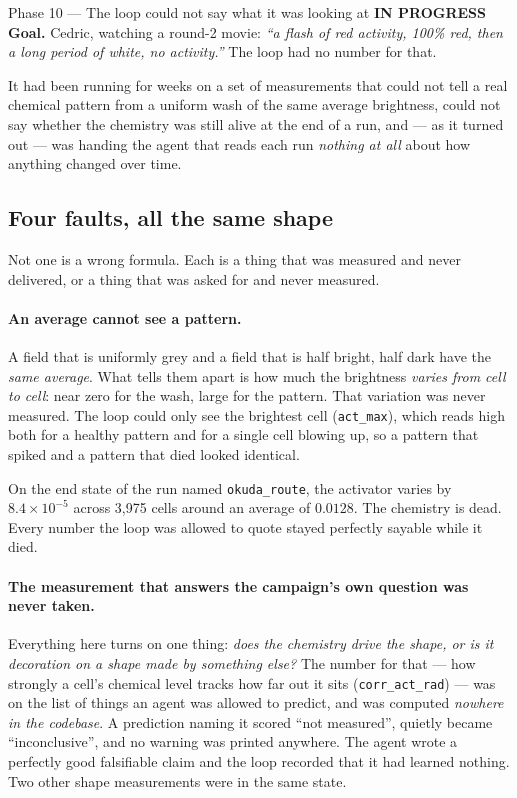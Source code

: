 \documentclass[11pt,a4paper]{article}
\newcommand{\code}[1]{\texttt{#1}}
\newcommand{\prog}{\textcolor{warn}{\textbf{IN PROGRESS}}}
\begin{document}
\begin{phasebox}{Phase 10 --- The loop could not say what it was looking at \hfill \prog}
\textbf{Goal.} Cedric, watching a round-2 movie: \emph{``a flash of red activity, 100\% red, then
a long period of white, no activity.''} The loop had no number for that.

It had been running for weeks on a set of measurements that could not tell a real chemical pattern
from a uniform wash of the same average brightness, could not say whether the chemistry was still
alive at the end of a run, and --- as it turned out --- was handing the agent that reads each run
\emph{nothing at all} about how anything changed over time.

\subsection*{Four faults, all the same shape}
Not one is a wrong formula. Each is a thing that was measured and never delivered, or a thing that
was asked for and never measured.

\paragraph{An average cannot see a pattern.} A field that is uniformly grey and a field that is
half bright, half dark have the \emph{same average}. What tells them apart is how much the
brightness \emph{varies from cell to cell}: near zero for the wash, large for the pattern. That
variation was never measured. The loop could only see the brightest cell (\code{act\_max}), which
reads high both for a healthy pattern and for a single cell blowing up, so a pattern that spiked
and a pattern that died looked identical.

On the end state of the run named \code{okuda\_route}, the activator varies by
$8.4\times10^{-5}$ across 3{,}975 cells around an average of $0.0128$. The chemistry is dead.
Every number the loop was allowed to quote stayed perfectly sayable while it died.

\paragraph{The measurement that answers the campaign's own question was never taken.} Everything
here turns on one thing: \emph{does the chemistry drive the shape, or is it decoration on a shape
made by something else?} The number for that --- how strongly a cell's chemical level tracks how
far out it sits (\code{corr\_act\_rad}) --- was on the list of things an agent was allowed to
predict, and was computed \emph{nowhere in the codebase}. A prediction naming it scored ``not
measured'', quietly became ``inconclusive'', and no warning was printed anywhere. The agent wrote
a perfectly good falsifiable claim and the loop recorded that it had learned nothing. Two other
shape measurements were in the same state.


\end{phasebox}
\end{document}
